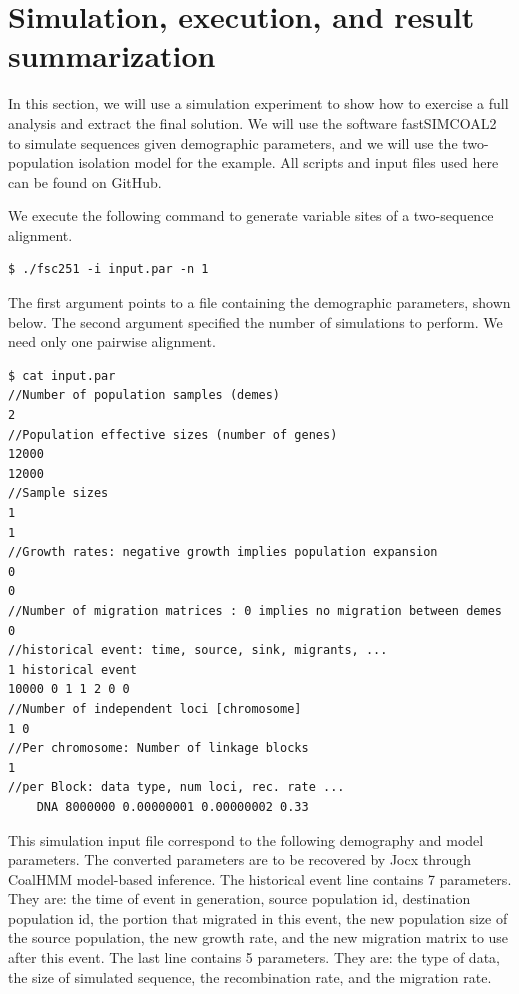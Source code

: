 \documentclass[graybox]{svmult}
\begin{document}
\section{Simulation, execution, and result summarization}


In this section, we will use a simulation experiment to show how to exercise a full analysis and extract the final solution.  We will use the software fastSIMCOAL2 \cite{excoffier2013robust} to simulate sequences given demographic parameters, and we will use the two-population isolation model for the example.  All scripts and input files used here can be found on GitHub.

We execute the following command to generate variable sites of a two-sequence alignment.

 {\scriptsize{}\begin{verbatim}
$ ./fsc251 -i input.par -n 1
\end{verbatim}}

The first argument points to a file containing the demographic parameters, shown below.  The second argument specified the number of simulations to perform.  We need only one pairwise alignment.

 {\scriptsize{}\begin{verbatim}
$ cat input.par
//Number of population samples (demes)
2
//Population effective sizes (number of genes)
12000
12000
//Sample sizes
1
1
//Growth rates: negative growth implies population expansion
0
0
//Number of migration matrices : 0 implies no migration between demes
0
//historical event: time, source, sink, migrants, ...
1 historical event
10000 0 1 1 2 0 0
//Number of independent loci [chromosome]
1 0
//Per chromosome: Number of linkage blocks
1
//per Block: data type, num loci, rec. rate ...
    DNA 8000000 0.00000001 0.00000002 0.33
\end{verbatim}}

This simulation input file correspond to the following demography and model parameters.  The converted parameters are to be recovered by Jocx through CoalHMM model-based inference.  The historical event line contains 7 parameters.  They are: the time of event in generation, source population id, destination population id, the portion that migrated in this event, the new population size of the source population, the new growth rate, and the new migration matrix to use after this event.  The last line contains 5 parameters.  They are: the type of data, the size of simulated sequence, the recombination rate, and the migration rate.
\end{document}
